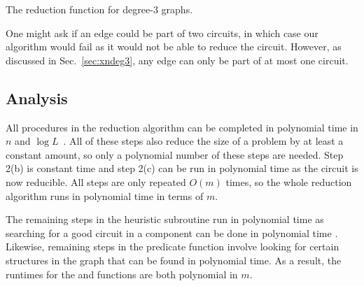\begin{algorithm}
\caption{\label{alg:reduction} The reduction function for degree-3 graphs.}
\end{algorithm}

One might ask if an edge could be part of two circuits, in which case our algorithm would fail as it would not be able to reduce the circuit. However, as discussed in Sec.\ \ref{sec:xndeg3}, any edge can only be part of at most one circuit.

\subsection{Analysis}

All procedures in the reduction algorithm can be completed in polynomial time in $n$ and $\log L$~\cite{xiao2016degree3}. All of these steps also reduce the size of a problem by at least a constant amount, so only a polynomial number of these steps are needed. Step 2(b) is constant time and step 2(c) can be run in polynomial time as the circuit is now reducible. All steps are only repeated $O(m)$ times, so the whole reduction algorithm runs in polynomial time in terms of $m$.

The remaining steps in the heuristic subroutine run in polynomial time as searching for a good circuit in a component can be done in polynomial time \cite{xiao2016degree3}. Likewise, remaining steps in the predicate function involve looking for certain structures in the graph that can be found in polynomial time. As a result, the runtimes for the \FnPredicatethree and \FnHeuristicthree functions are both polynomial in $m$.

